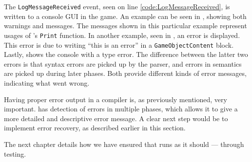 The \texttt{LogMessageReceived} event, seen on line \ref{code:LogMessageReceived}, is written to a console GUI in the \dazel{} game. An example can be seen in , showing both warnings and messages. The messages shown in this particular example represent usages of \dazel{}'s \texttt{Print} function. In another example, seen in , an error is displayed. This error is due to writing ``this is an error'' in a \texttt{GameObjectContent} block. Lastly,  shows the \dazel{} console with a type error. The difference between the latter two errors is that syntax errors are picked up by the parser, and errors in semantics are picked up during later phases. Both provide different kinds of error messages, indicating what went wrong.


Having proper error output in a compiler is, as previously mentioned, very important. \dazel{} has detection of errors in multiple phases, which allows it to give a more detailed and descriptive error message. A clear next step would be to implement error recovery, as described earlier in this section.

The next chapter details how we have ensured that \dazel{} runs as it should — through testing.
